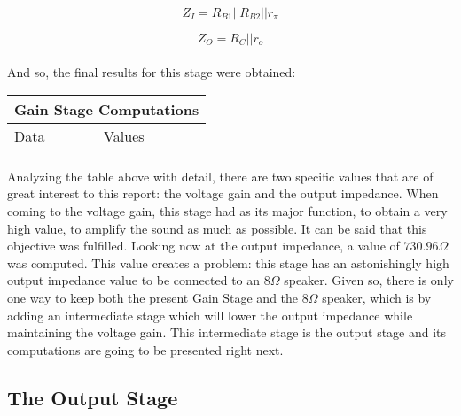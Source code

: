 \begin{equation}
    Z_I=R_{B1}||R_{B2}||r_\pi
\end{equation}

\begin{equation}
    Z_O=R_C||r_o
\end{equation}


\paragraph{}And so, the final results for this stage were obtained:

\begin{table}[H]
\centering
\begin{tabular}{|l|l|} 
\hline
\multicolumn{2}{|l|}{\textbf{Gain Stage Computations}}  \\ 
\hline
Data             & Values                               \\ 
\hline
        
\end{tabular}
\end{table}

\paragraph{}Analyzing the table above with detail, there are two specific values that are of great interest to this report: the voltage gain and the output impedance. When coming to the voltage gain, this stage had as its major function, to obtain a very high value, to amplify the sound as much as possible. It can be said that this objective was fulfilled. Looking now at the output impedance, a value of  $730.96 \Omega$ was computed. This value creates a problem: this stage has an astonishingly high output impedance value to be connected to an $8 \Omega$ speaker. Given so, there is only one way to keep both the present Gain Stage and the $8 \Omega$ speaker, which is by adding an intermediate stage which will lower the output impedance while maintaining the voltage gain. This intermediate stage is the output stage and its computations are going to be presented right next. 





\subsection{The Output Stage}

